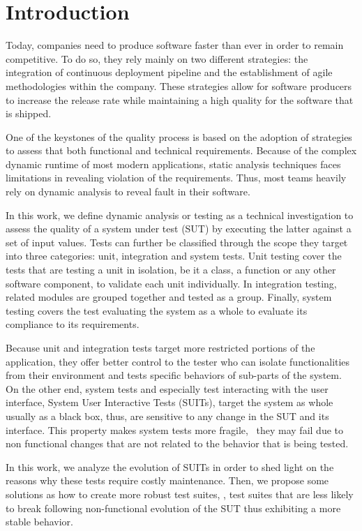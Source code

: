 \chapter{Introduction}

Today, companies need to produce software faster than ever in order to remain competitive. To do so, they rely mainly on two different strategies: the integration of continuous deployment pipeline and the establishment of agile methodologies within the company. These strategies allow for software producers to increase the release rate while maintaining a high quality for the software that is shipped.

One of the keystones of the quality process is based on the adoption of strategies to assess that both functional and technical requirements. Because of the complex dynamic runtime of most modern applications, static analysis techniques faces limitations in revealing violation of the requirements. Thus, most teams heavily rely on dynamic analysis to reveal fault in their software. 

In this work, we define dynamic analysis or testing as a technical investigation to assess the quality of a system under test (SUT) by executing the latter against a set of input values. Tests can further be classified through the scope they target into three categories: unit, integration and system tests. Unit testing cover the tests that are testing a unit in isolation, be it a class, a function or any other software component,  to validate each unit individually. In integration testing, related modules are grouped together and tested as a group. Finally, system testing covers the test evaluating the system as a whole to evaluate its compliance to its requirements.

Because unit and integration tests target more restricted portions of the application, they offer better control to the tester who can isolate functionalities from their environment and tests specific behaviors of sub-parts of the system. On the other end, system tests and especially test interacting with the user interface, System User Interactive Tests (SUITs), target the system as whole usually as a black box, thus, are sensitive to any change in the SUT and its interface. This property makes system tests more fragile, \ie\ they may fail due to non functional changes that are not related to the behavior that is being tested.

In this work, we analyze the evolution of SUITs in order to shed light on the reasons why these tests require costly maintenance. Then, we propose some solutions as how to create more robust test suites, \ie, test suites that are less likely to break following non-functional evolution of the SUT thus exhibiting a more stable behavior.

